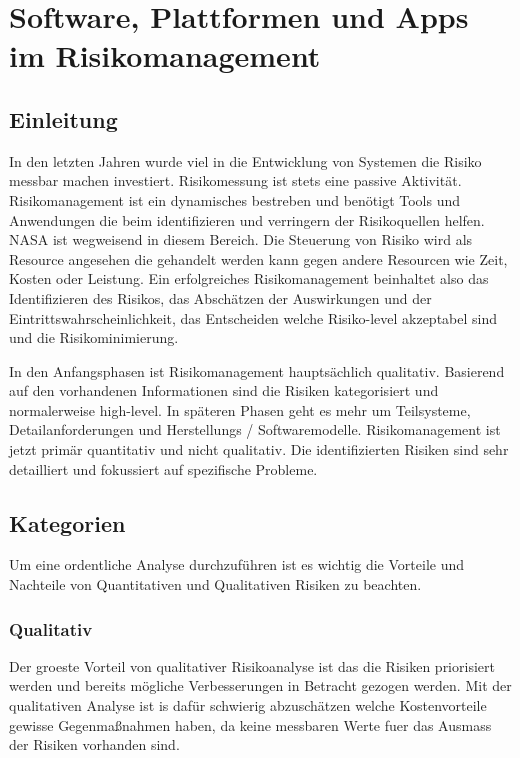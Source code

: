 \chapter{Software, Plattformen und Apps im Risikomanagement}

\section{Einleitung}

In den letzten Jahren wurde viel in die Entwicklung von Systemen die Risiko messbar machen investiert. Risikomessung ist stets eine passive Aktivität. Risikomanagement ist ein dynamisches bestreben und benötigt Tools und Anwendungen die beim identifizieren und verringern der Risikoquellen helfen. \cite{Mausser1997} 
NASA ist wegweisend in diesem Bereich. Die Steuerung von Risiko wird als Resource angesehen die gehandelt werden kann gegen andere Resourcen wie Zeit, Kosten oder Leistung. Ein erfolgreiches Risikomanagement beinhaltet also das Identifizieren des Risikos, das Abschätzen der Auswirkungen und der Eintrittswahrscheinlichkeit, das Entscheiden welche Risiko-level akzeptabel sind und die Risikominimierung.\cite{Feather2000}

In den Anfangsphasen ist Risikomanagement hauptsächlich qualitativ. Basierend auf den vorhandenen Informationen sind die Risiken kategorisiert und normalerweise high-level. In späteren Phasen geht es mehr um Teilsysteme, Detailanforderungen und Herstellungs / Softwaremodelle. Risikomanagement ist jetzt primär quantitativ und nicht qualitativ. Die identifizierten Risiken sind sehr detailliert und fokussiert auf spezifische Probleme.\cite{Feather2000}


\section{Kategorien}

Um eine ordentliche Analyse durchzuführen ist es wichtig die Vorteile und Nachteile von Quantitativen und Qualitativen Risiken zu beachten.\cite{Stoneburner2002}

\subsection{Qualitativ}
Der groeste Vorteil von qualitativer Risikoanalyse ist das die Risiken priorisiert werden und bereits mögliche Verbesserungen in Betracht gezogen werden.
Mit der qualitativen Analyse ist is dafür schwierig abzuschätzen welche Kostenvorteile gewisse Gegenmaßnahmen haben, da keine messbaren Werte fuer das Ausmass der Risiken vorhanden sind.\cite{Stoneburner2002}
